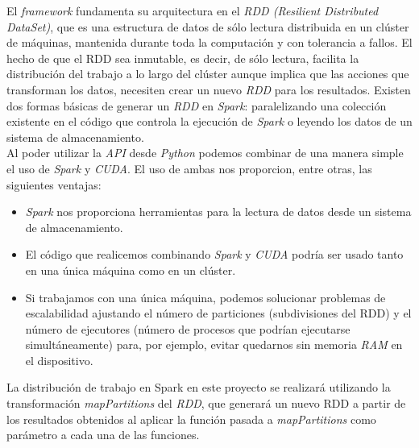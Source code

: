 El \textit{framework} fundamenta su arquitectura en el \textit{RDD (Resilient Distributed DataSet)}, que es una estructura de datos de sólo lectura distribuida en un clúster de máquinas, mantenida durante toda la computación y con tolerancia a fallos. El hecho de que el RDD sea inmutable, es decir, de sólo lectura, facilita la distribución del trabajo a lo largo del clúster aunque implica que las acciones que transforman los datos, necesiten crear un nuevo \textit{RDD} para los resultados. Existen dos formas básicas de generar un \textit{RDD} en \textit{Spark}: paralelizando una colección existente en el código que controla la ejecución de \textit{Spark} o leyendo los datos de un sistema de almacenamiento. \\

Al poder utilizar la \textit{API} desde \textit{Python} podemos combinar de una manera simple el uso de \textit{Spark} y \textit{CUDA}. El uso de ambas nos proporcion, entre otras, las siguientes ventajas:\\

\begin{itemize}
  \item \textit{Spark} nos proporciona herramientas para la lectura de datos desde un sistema de almacenamiento.
  \item El código que realicemos combinando \textit{Spark} y \textit{CUDA} podría ser usado tanto en una única máquina como en un clúster.
  \item Si trabajamos con una única máquina, podemos solucionar problemas de escalabilidad ajustando el número de particiones (subdivisiones del RDD) y el número de ejecutores (número de procesos que podrían ejecutarse simultáneamente) para, por ejemplo, evitar quedarnos sin memoria \textit{RAM} en el dispositivo.\\
\end{itemize}

La distribución de trabajo en Spark en este proyecto se realizará utilizando la transformación \textit{mapPartitions} del \textit{RDD}, que generará un nuevo RDD a partir de los resultados obtenidos al aplicar la función pasada a \textit{mapPartitions} como parámetro a cada una de las funciones. \\

